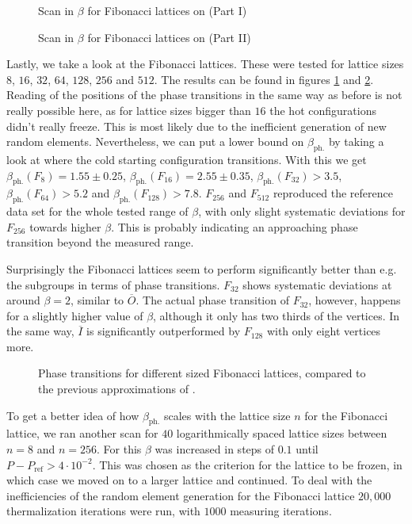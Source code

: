 \begin{figure}[!hbt]
 \centering
 
 \caption{Scan in $\beta$ for Fibonacci lattices on \SUTwo (Part I)}
 \label{plot:fibonacciI}
\end{figure}
\begin{figure}[!hbt]
 \centering
 
 \caption{Scan in $\beta$ for Fibonacci lattices on \SUTwo (Part II)}
 \label{plot:fibonacciII}
\end{figure}

Lastly, we take a look at the Fibonacci lattices. These were tested for lattice sizes  $8$, $16$, $32$, $64$, $128$, $256$ and $512$. The results can be found in figures \ref{plot:fibonacciI} and \ref{plot:fibonacciII}. Reading of the positions of the phase transitions in the same way as before is not really possible here, as for lattice sizes bigger than $16$ the hot configurations didn't really freeze. This is most likely due to the inefficient generation of new random elements. Nevertheless, we can put a lower bound on $\beta_{\textrm{ph.}}$ by taking a look at where the cold starting configuration transitions. With this we get $\beta_{\textrm{ph.}}(F_8) = 1.55 \pm 0.25$, $\beta_{\textrm{ph.}}(F_16) = 2.55 \pm 0.35 $, $\beta_{\textrm{ph.}}(F_{32}) > 3.5 $, $\beta_{\textrm{ph.}}(F_{64}) > 5.2 $ and $\beta_{\textrm{ph.}}(F_{128}) > 7.8$. $F_{256}$ and $F_{512}$ reproduced the reference data set for the whole tested range of $\beta$, with only slight systematic deviations for $F_{256}$ towards higher $\beta$. This is probably indicating an approaching phase transition beyond the measured range.

Surprisingly the Fibonacci lattices seem to perform significantly better than e.g. the subgroups in terms of phase transitions. $F_{32}$ shows systematic deviations at around $\beta = 2$, similar to $\overline{O}$. The actual phase transition of $F_{32}$, however, happens for a slightly higher value of $\beta$, although it only has two thirds of the vertices. In the same way, $\overline{I}$ is significantly outperformed by $F_{128}$ with only eight vertices more. \\

\begin{figure}[!hbt]
 \centering
 
 \caption{Phase transitions for different sized Fibonacci lattices, compared to the previous approximations of \SUTwo.}
 \label{plot:fibPhaseScan}
\end{figure}

To get a better idea of how $\beta_{\textrm{ph.}}$ scales with the lattice size $n$ for the Fibonacci lattice, we ran another scan for $40$ logarithmically spaced lattice sizes between $n=8$ and $n=256$. For this $\beta$ was increased in steps of $0.1$ until $P-P_{\textrm{ref}} > 4 \cdot 10^{-2}$. This was chosen as the criterion for the lattice to be frozen, in which case we moved on to a larger lattice and continued. To deal with the inefficiencies of the random element generation for the Fibonacci lattice $20,000$ thermalization iterations were run, with $1000$ measuring iterations.

